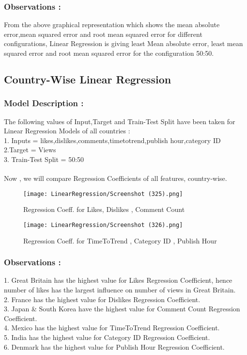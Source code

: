 \documentclass[runningheads]{llncs}
\begin{document}
\subsubsection{Observations : }
From the above graphical representation which shows the mean absolute error,mean
squared error and root mean squared error for different configurations, Linear Regression is giving least Mean absolute error, least mean squared error and root mean squared
error for the configuration 50:50.

\subsection{Country-Wise Linear Regression}
\subsubsection{Model Description : }
The following values of Input,Target and Train-Test Split have been taken for Linear Regression Models of all countries : \\
1. Inputs = likes,dislikes,comments,timetotrend,publish hour,category ID \\
2.Target = Views \\  
3. Train-Test Split = 50:50 \\ \\ 
Now , we will compare Regression Coefficients of all features, country-wise.
\begin{figure}[H]
\centering
\texttt{[image: LinearRegression/Screenshot (325).png]}
\caption{Regression Coeff. for Likes, Dislikes , Comment Count} 
\end{figure}
\begin{figure}[H]
\centering
\texttt{[image: LinearRegression/Screenshot (326).png]}
\caption{Regression Coeff. for TimeToTrend , Category ID , Publish Hour} 
\end{figure}
\subsubsection{Observations : }
1. Great Britain has the highest value for Likes Regression Coefficient, hence number of likes has the largest influence on number of views in Great Britain. \\
2. France has the highest value for Dislikes Regression Coefficient. \\
3. Japan \& South Korea have the highest value for Comment Count Regression Coefficient. \\
4. Mexico has the highest value for TimeToTrend Regression Coefficient. \\
5. India has the highest value for Category ID Regression Coefficient. \\
6. Denmark has the highest value for Publish Hour Regression Coefficient.
\end{document}
